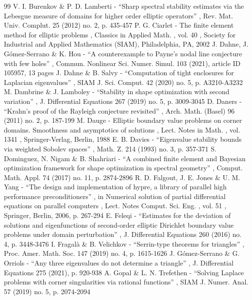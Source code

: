 \documentclass[11pt]{article}
\numberwithin{equation}{section}\newtheorem*{jepEnonce}{\jepEnonceTitle}\newenvironment{enonce*}[1]{\def\jepEnonceTitle{#1}\jepEnonce}{\endjepEnonce}\newtheorem*{conj*}{Conjecture}
\theoremstyle{plain}
\theoremstyle{definition}
\begin{document}
\begin{thebibliography}{99}
 V. I. Burenkov \& P. D. Lamberti - “Sharp spectral stability estimates via the Lebesgue measure of domains for higher order elliptic operators” , Rev. Mat. Univ. Complut. 25 (2012) no. 2, p. 435-457
 P. G. Ciarlet - The finite element method for elliptic problems , Classics in Applied Math. , vol. 40 , Society for Industrial and Applied Mathematics (SIAM), Philadelphia, PA, 2002
 J. Dahne, J. Gómez-Serrano \& K. Hou - “A counterexample to Payne’s nodal line conjecture with few holes” , Commun. Nonlinear Sci. Numer. Simul. 103 (2021), article ID 105957, 13 pages
 J. Dahne \& B. Salvy - “Computation of tight enclosures for Laplacian eigenvalues” , SIAM J. Sci. Comput. 42 (2020) no. 5, p. A3210-A3232
 M. Dambrine \& J. Lamboley - “Stability in shape optimization with second variation” , J. Differential Equations 267 (2019) no. 5, p. 3009-3045
 D. Daners - “Krahn’s proof of the Rayleigh conjecture revisited” , Arch. Math. (Basel) 96 (2011) no. 2, p. 187-199
 M. Dauge - Elliptic boundary value problems on corner domains. Smoothness and asymptotics of solutions , Lect. Notes in Math. , vol. 1341 , Springer-Verlag, Berlin, 1988
 E. B. Davies - “Eigenvalue stability bounds via weighted Sobolev spaces” , Math. Z. 214 (1993) no. 3, p. 357-371
 S. Dominguez, N. Nigam \& B. Shahriari - “A combined finite element and Bayesian optimization framework for shape optimization in spectral geometry” , Comput. Math. Appl. 74 (2017) no. 11, p. 2874-2896
 R. D. Falgout, J. E. Jones \& U. M. Yang - “The design and implementation of hypre, a library of parallel high performance preconditioners” , in Numerical solution of partial differential equations on parallel computers , Lect. Notes Comput. Sci. Eng. , vol. 51 , Springer, Berlin, 2006, p. 267-294
 E. Feleqi - “Estimates for the deviation of solutions and eigenfunctions of second-order elliptic Dirichlet boundary value problems under domain perturbation” , J. Differential Equations 260 (2016) no. 4, p. 3448-3476
 I. Fragalà \& B. Velichkov - “Serrin-type theorems for triangles” , Proc. Amer. Math. Soc. 147 (2019) no. 4, p. 1615-1626
 J. Gómez-Serrano \& G. Orriols - “Any three eigenvalues do not determine a triangle” , J. Differential Equations 275 (2021), p. 920-938
 A. Gopal \& L. N. Trefethen - “Solving Laplace problems with corner singularities via rational functions” , SIAM J. Numer. Anal. 57 (2019) no. 5, p. 2074-2094

\end{thebibliography}
\end{document}
